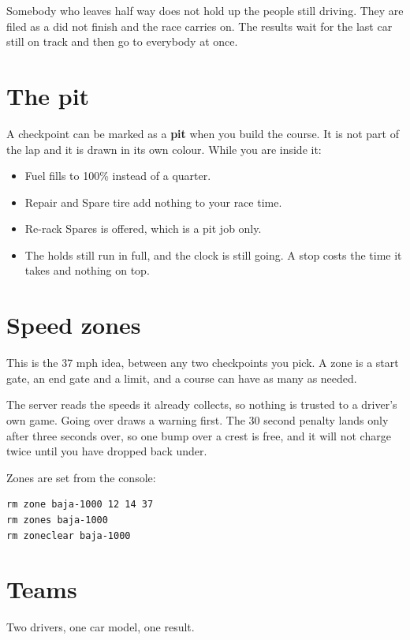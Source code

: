 \documentclass[11pt,a4paper]{article}
\begin{document}
Somebody who leaves half way does not hold up the people still driving. They
are filed as a did not finish and the race carries on. The results wait for
the last car still on track and then go to everybody at once.

\section{The pit}

A checkpoint can be marked as a \textbf{pit} when you build the course. It is
not part of the lap and it is drawn in its own colour. While you are inside
it:

\begin{itemize}
  \item Fuel fills to 100\% instead of a quarter.
  \item Repair and Spare tire add nothing to your race time.
  \item Re-rack Spares is offered, which is a pit job only.
  \item The holds still run in full, and the clock is still going. A stop
        costs the time it takes and nothing on top.
\end{itemize}

\section{Speed zones}

This is the 37 mph idea, between any two checkpoints you pick. A zone is a
start gate, an end gate and a limit, and a course can have as many as needed.

The server reads the speeds it already collects, so nothing is trusted to a
driver's own game. Going over draws a warning first. The 30 second penalty
lands only after three seconds over, so one bump over a crest is free, and it
will not charge twice until you have dropped back under.

Zones are set from the console:

\begin{lstlisting}
rm zone baja-1000 12 14 37
rm zones baja-1000
rm zoneclear baja-1000
\end{lstlisting}

\section{Teams}

Two drivers, one car model, one result.
\end{document}
